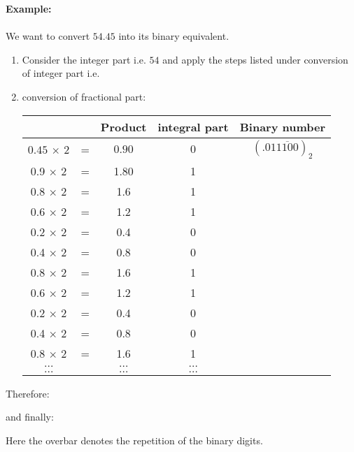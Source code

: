 	\begin{tcolorbox}[colframe=black,colback=white,sharp corners]
	\textbf{{\Large {}}Example:}\\\\
	We want to convert $54.45$ into its binary equivalent.\\
	
	\begin{enumerate}
		\item Consider the integer part i.e. $54$ and apply the steps listed under conversion of integer part i.e.

		\item conversion of fractional part:
		\vskip 10pt
	
		\begin{center}
			\begin{tabular}{ccccc}
			                  &   &  Product & integral part &
			Binary number \\ \hline $0.45$ $\times$ $2$   & = &  $0.90$    &   $0$ &
			$(.01\overline{1100})_2$ \\
			0.9 $\times$ 2   & = &  1.80    &    1 &  \\
			0.8 $\times$ 2   & = &  1.6     &    1 &  \\
			0.6 $\times$ 2   & = &  1.2     &    1 &  \\
			0.2 $\times$ 2   & = &  0.4     &    0 &  \\
			0.4 $\times$ 2   & = &  0.8     &    0 &  \\
			0.8 $\times$ 2   & = &  1.6     &    1 &  \\
			0.6 $\times$ 2   & = &  1.2     &    1 &  \\
			0.2 $\times$ 2   & = &  0.4     &    0 &  \\
			0.4 $\times$ 2   & = &  0.8     &    0 &  \\
			0.8 $\times$ 2   & = &  1.6     &    1 &  \\
			$\dots$          &   &  $\dots$ &    $\dots$ &  \\
			$\dots$          &   &  $\dots$ &    $\dots$ &  \\
			\hline
			\end{tabular}
		\end{center}
	\end{enumerate} 
	Therefore:
	
	and finally:
	
	\end{tcolorbox}
	
	Here the overbar denotes the repetition of the binary digits.
	
